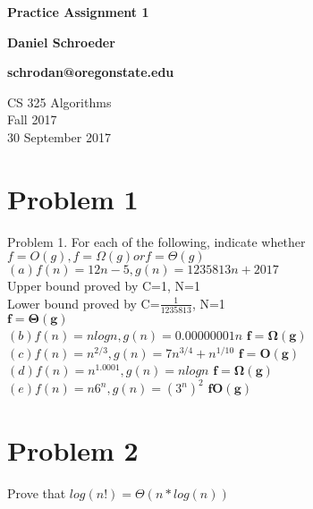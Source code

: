 \documentclass[10pt, draftclsnofoot, onecolumn]{IEEEtran}
\begin{document}
\begin{titlepage}
    \begin{center}
        \vspace*{1.5cm}

        \textbf{Practice Assignment 1}

        \textbf{Daniel Schroeder}
        
        \textbf{schrodan@oregonstate.edu}

        \vspace{1.5cm}

        CS 325 Algorithms\\
        Fall 2017\\
        30 September 2017\\

        \vspace{1.5cm}


    \end{center}
\end{titlepage}

\newpage 
   
\section{Problem 1}
Problem 1. For each of the following, indicate whether \(f = O(g), f = \Omega(g) or f = \Theta(g) \)\\
\((a) f(n) = 12n - 5, g(n) = 1235813n + 2017\)\\
Upper bound proved by C=1, N=1\\
Lower bound proved by C=\(\frac{1}{1235813}\), N=1 \\  
\(\boldsymbol{f = \Theta(g)}\) \\

\((b) f(n) = n log n, g(n) = 0.00000001n\) \(\boldsymbol{f = \Omega(g)}\) \\
\((c) f(n) = n^{2/3} , g(n) = 7n^{3/4} + n^{1/10} \) \(\boldsymbol{f = O(g)}\) \\
\((d) f(n) = n^{1.0001} , g(n) = n log n \) \(\boldsymbol{f = \Omega(g)}\) \\
\((e) f(n) = n6^n , g(n) = (3^n)^2 \) \(\boldsymbol{f O(g)}\) \\

\newpage
\section{Problem 2}
Prove that \(log(n!) = \Theta(n*log(n))\) \\
\end{document}
